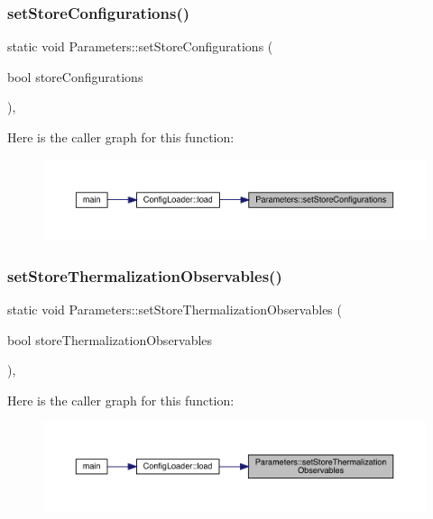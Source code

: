 \subsubsection{\texorpdfstring{setStoreConfigurations()}{setStoreConfigurations()}}
{\footnotesize\ttfamily static void Parameters\+::set\+Store\+Configurations (\begin{DoxyParamCaption}\item[{bool}]{store\+Configurations }\end{DoxyParamCaption})\hspace{0.3cm}{\ttfamily [inline]}, {\ttfamily [static]}}

Here is the caller graph for this function\+:\nopagebreak
\begin{figure}[H]
\begin{center}
\leavevmode
\includegraphics[width=350pt]{class_parameters_a7ab55c1529015de4c5c182cfa9f004e8_icgraph}
\end{center}
\end{figure}
\mbox{\label{class_parameters_a84290346277f15c8241c035b7aa452ad}} 
\subsubsection{\texorpdfstring{setStoreThermalizationObservables()}{setStoreThermalizationObservables()}}
{\footnotesize\ttfamily static void Parameters\+::set\+Store\+Thermalization\+Observables (\begin{DoxyParamCaption}\item[{bool}]{store\+Thermalization\+Observables }\end{DoxyParamCaption})\hspace{0.3cm}{\ttfamily [inline]}, {\ttfamily [static]}}

Here is the caller graph for this function\+:\nopagebreak
\begin{figure}[H]
\begin{center}
\leavevmode
\includegraphics[width=350pt]{class_parameters_a84290346277f15c8241c035b7aa452ad_icgraph}
\end{center}
\end{figure}
\mbox{\label{class_parameters_af882fdb68c96c27f1bb99cebe3aecd21}} 
